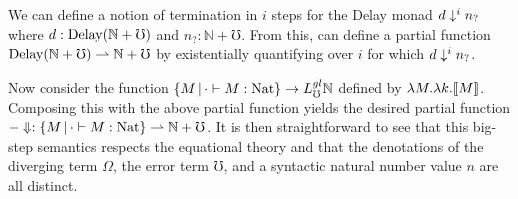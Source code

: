 We can define a notion of termination in $i$ steps for the Delay monad $d \downarrow^i
n_?$ where $d : \text{Delay}(\mathbb{N} + {\mho})$ and $n_? : \mathbb{N} + {\mho}$. From
this, can define a partial function $\text{Delay} (\mathbb{N} + {\mho})
\rightharpoonup \mathbb{N} + {\mho}$ by existentially quantifying over $i$
for which $d \downarrow^i n_?$.

Now consider the function $\{M \,|\, \cdot \vdash M : \text{Nat} \} \to L_\mho^{gl}
\mathbb{N}$ defined by $\lambda M. \lambda k .\llbracket {M} \rrbracket$. Composing this with the
above partial function yields the desired partial function $-\Downarrow : \{M
\,|\, \cdot \vdash M : \text{Nat} \} \rightharpoonup \mathbb{N} + {\mho}$. It is
then straightforward to see that this big-step semantics respects the equational
theory and that the denotations of the diverging term $\Omega$, the error term
$\mho$, and a syntactic natural number value $n$ are all distinct.

